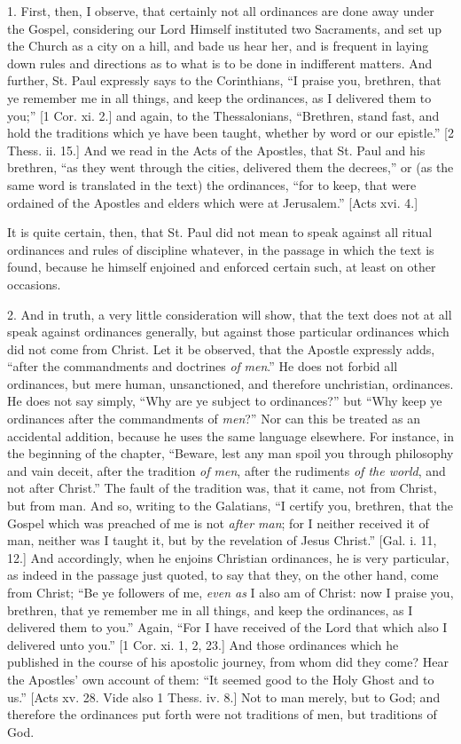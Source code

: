 1. First, then, I observe, that certainly not all ordinances are
done away under the Gospel, considering our Lord Himself instituted
two Sacraments, and set up the Church as a city on a hill, and bade us
hear her, and is frequent in laying down rules and directions as to
what is to be done in indifferent matters. And further, St. Paul
expressly says to the Corinthians, ``I praise you, brethren, that
ye remember me in all things, and keep the ordinances, as I delivered
them to you;'' [1 Cor. xi. 2.] and again, to the Thessalonians,
``Brethren, stand fast, and hold the traditions which ye have been
taught, whether by word or our epistle.'' [2 Thess. ii. 15.] And
we read in the Acts of the Apostles, that St. Paul and his brethren,
``as they went through the cities, delivered them the
decrees,'' or (as the same word is translated in the text) the
ordinances, ``for to keep, that were ordained of the Apostles and
elders which were at Jerusalem.'' [Acts xvi. 4.]

It is quite certain, then, that St. Paul did not mean to speak
against all ritual ordinances and rules of discipline whatever, in the
passage in which the text is found, because he himself enjoined and
enforced certain such, at least on other occasions.

2. And in truth, a very little consideration will show, that the
text does not at all speak against ordinances generally, but against
those particular ordinances which did not come from Christ. Let it be
observed, that the Apostle expressly adds, ``after the
commandments and doctrines \emph{of} \emph{men}.'' He does not
forbid all ordinances, but mere human, unsanctioned, and therefore
unchristian, ordinances. He does not say simply, ``Why are ye
subject to ordinances?'' but ``Why keep ye ordinances after
the commandments of \emph{men}?'' Nor can this be treated as an
accidental addition, because he uses the same language elsewhere. For
instance, in the beginning of the chapter, ``Beware, lest any man
spoil you through philosophy and vain deceit, after the tradition \emph{of
men}, after the rudiments \emph{of the world}, and not after
Christ.'' The fault of the tradition was, that it came, not from
Christ, but from man. And so, writing to the Galatians, ``I
certify you, brethren, that the Gospel which was preached of me is not
\emph{after man}; for I neither received it of man, neither was I
taught it, but by the revelation of Jesus Christ.'' [Gal. i. 11,
12.] And accordingly, when he enjoins Christian ordinances, he is very
particular, as indeed in the passage just quoted, to say that they, on
the other hand, come from Christ; ``Be ye followers of me, \emph{even
as} I also am of Christ: now I praise you, brethren, that ye
remember me in all things, and keep the ordinances, as I delivered
them to you.'' Again, ``For I have received of the Lord that
which also I delivered unto you.'' [1 Cor. xi. 1, 2, 23.] And
those ordinances which he published in the course of his apostolic
journey, from whom did they come? Hear the Apostles' own account of
them: ``It seemed good to the Holy Ghost and to us.'' [Acts
xv. 28. Vide also 1 Thess. iv. 8.] Not to man merely, but to God; and
therefore the ordinances put forth were not traditions of men, but
traditions of God.

